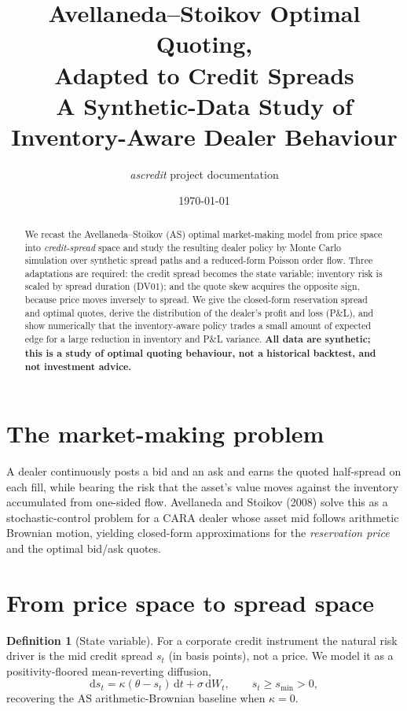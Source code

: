 \documentclass[11pt]{article}
\title{\textbf{Avellaneda--Stoikov Optimal Quoting,\\ Adapted to Credit Spreads}\\[4pt]
\large A Synthetic-Data Study of Inventory-Aware Dealer Behaviour}
\author{\textit{ascredit} project documentation}
\date{\today}
\theoremstyle{definition}
\newtheorem{definition}{Definition}
\theoremstyle{plain}
\newcommand{\dd}{\mathrm{d}}
\begin{document}
\maketitle

\begin{abstract}
\noindent
We recast the Avellaneda--Stoikov (AS) optimal market-making model from price
space into \emph{credit-spread} space and study the resulting dealer policy by
Monte Carlo simulation over synthetic spread paths and a reduced-form Poisson
order flow. Three adaptations are required: the credit spread becomes the state
variable; inventory risk is scaled by spread duration (DV01); and the quote
skew acquires the opposite sign, because price moves inversely to spread.
We give the closed-form reservation spread and optimal quotes, derive the
distribution of the dealer's profit and loss (P\&L), and show numerically that
the inventory-aware policy trades a small amount of expected edge for a large
reduction in inventory and P\&L variance. \textbf{All data are synthetic; this
is a study of optimal quoting behaviour, not a historical backtest, and not
investment advice.}
\end{abstract}

\tableofcontents
\bigskip

\section{The market-making problem}
A dealer continuously posts a bid and an ask and earns the quoted half-spread
on each fill, while bearing the risk that the asset's value moves against the
inventory accumulated from one-sided flow. Avellaneda and Stoikov (2008) solve
this as a stochastic-control problem for a CARA dealer whose asset mid follows
arithmetic Brownian motion, yielding closed-form approximations for the
\emph{reservation price} and the optimal bid/ask quotes.

\section{From price space to spread space}
\label{sec:credit}

\begin{definition}[State variable]
For a corporate credit instrument the natural risk driver is the mid credit
spread $s_t$ (in basis points), not a price. We model it as a positivity-floored
mean-reverting diffusion,
\begin{equation}
\dd s_t=\kappa(\theta-s_t)\,\dd t+\sigma\,\dd W_t,\qquad s_t\ge s_{\min}>0,
\label{eq:ou}
\end{equation}
recovering the AS arithmetic-Brownian baseline when $\kappa=0$.
\end{definition}
\end{document}
